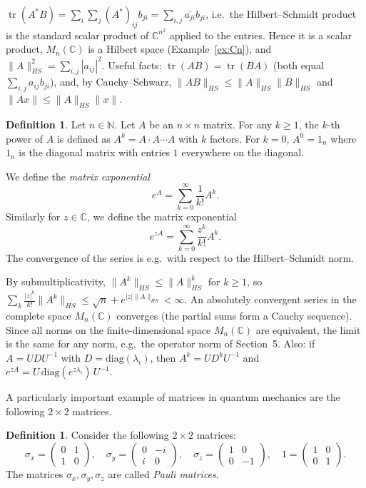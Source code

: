 \documentclass[11pt,a4paper]{article}
\numberwithin{equation}{section}
\newcommand{\N}{\mathbb{N}}
\newcommand{\C}{\mathbb{C}}
\newcommand{\conj}[1]{\overline{#1}}
\DeclareMathOperator{\tr}{tr}
\theoremstyle{plain}
\theoremstyle{definition}
\newtheorem{definition}[theorem]{Definition}
\theoremstyle{plain}
\theoremstyle{definition}
\begin{document}
\begin{addition}
$\tr(A^*B)=\sum_i\sum_j(A^*)_{ij}b_{ji}=\sum_{i,j}\conj{a_{ji}}b_{ji}$, i.e.\ the
Hilbert--Schmidt product is the standard scalar product of $\C^{n^2}$ applied to the
entries. Hence it is a scalar product, $M_n(\C)$ is a Hilbert space (Example~\ref{ex:Cn}),
and $\|A\|_{HS}^2=\sum_{i,j}|a_{ij}|^2$. Useful facts: $\tr(AB)=\tr(BA)$ (both equal
$\sum_{i,j}a_{ij}b_{ji}$), and, by Cauchy--Schwarz, $\|AB\|_{HS}\le\|A\|_{HS}\|B\|_{HS}$ and
$\|Ax\|\le\|A\|_{HS}\|x\|$.
\end{addition}

\begin{definition}
Let $n\in\N$. Let $A$ be an $n\times n$ matrix. For any $k\geqslant1$, the $k$-th power of
$A$ is defined as $A^k=A\cdot A\cdots A$ with $k$ factors. For $k=0$, $A^0=1_n$ where $1_n$
is the diagonal matrix with entries $1$ everywhere on the diagonal.

We define the \emph{matrix exponential}
\[
e^A=\sum_{k=0}^\infty\frac1{k!}A^k .
\]
Similarly for $z\in\C$, we define the matrix exponential
\[
e^{zA}=\sum_{k=0}^\infty\frac{z^k}{k!}A^k .
\]
The convergence of the series is e.g.\ with respect to the Hilbert--Schmidt norm.
\end{definition}

\begin{addition}[(convergence)]
By submultiplicativity, $\|A^k\|_{HS}\le\|A\|_{HS}^k$ for $k\ge1$, so
$\sum_k\frac{|z|^k}{k!}\|A^k\|_{HS}\le\sqrt n+e^{|z|\|A\|_{HS}}<\infty$. An absolutely
convergent series in the complete space $M_n(\C)$ converges (the partial sums form a Cauchy
sequence). Since all norms on the finite-dimensional space $M_n(\C)$ are equivalent, the
limit is the same for any norm, e.g.\ the operator norm of Section~5. Also: if
$A=UDU^{-1}$ with $D=\mathrm{diag}(\lambda_i)$, then $A^k=UD^kU^{-1}$ and
$e^{zA}=U\,\mathrm{diag}(e^{z\lambda_i})\,U^{-1}$.
\end{addition}

A particularly important example of matrices in quantum mechanics are the following
$2\times2$ matrices.

\begin{definition}
Consider the following $2\times2$ matrices:
\[
\sigma_x=\begin{pmatrix}0&1\\1&0\end{pmatrix},\quad
\sigma_y=\begin{pmatrix}0&-i\\i&0\end{pmatrix},\quad
\sigma_z=\begin{pmatrix}1&0\\0&-1\end{pmatrix},\quad
1=\begin{pmatrix}1&0\\0&1\end{pmatrix}.
\]
The matrices $\sigma_x,\sigma_y,\sigma_z$ are called \emph{Pauli matrices}.
\end{definition}
\end{document}
